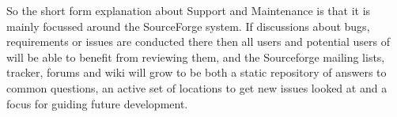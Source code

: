 So the short form explanation about Support and Maintenance is that it
is mainly focussed around the SourceForge system. If discussions about
bugs, requirements or issues are conducted there then all users and
potential users of {\REDUCE} will be able to benefit from reviewing
them, and the Sourceforge mailing lists, tracker, forums and wiki will
grow to be both a static repository of answers to common questions, an
active set of locations to get new issues looked at and a focus for
guiding future development.


